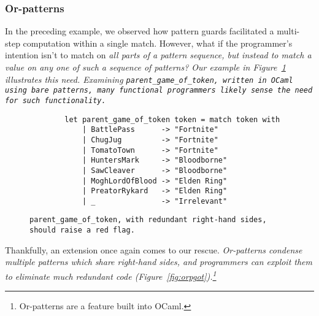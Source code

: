 \documentclass[manuscript,screen,review, 12pt]{acmart}
\begin{document}
        

\subsubsection{Or-patterns}

        In the preceding example, we observed how pattern guards facilitated a
        multi-step computation within a single match. However, what if the
        programmer's intention isn't to match on \it{all} parts of a pattern
        sequence, but instead to match a value on \it{any one} of such a
        sequence of patterns? Our example in Figure~\ref{fig:barepgot}
        illustrates this need. Examining \tt{parent\_game\_of\_token}, written
        in OCaml using bare patterns, many functional programmers likely sense
        the need for such functionality.
        
        
        \begin{figure}
            \begin{center}
                \begin{verbatim}
        let parent_game_of_token token = match token with 
            | BattlePass      -> "Fortnite"
            | ChugJug         -> "Fortnite"
            | TomatoTown      -> "Fortnite"
            | HuntersMark     -> "Bloodborne"
            | SawCleaver      -> "Bloodborne"
            | MoghLordOfBlood -> "Elden Ring"
            | PreatorRykard   -> "Elden Ring"
            | _               -> "Irrelevant"
                \end{verbatim}
            \end{center}    

        \caption{\tt{parent\_game\_of\_token}, with redundant right-hand sides,
        should raise a red flag.} 
        \label{fig:barepgot}
        \end{figure}

Thankfully, an extension once again comes to our rescue. \it{Or-patterns}
condense multiple patterns which share right-hand sides, and programmers can
exploit them to eliminate much redundant code
(Figure~\ref{fig:orpgot}).\footnote{Or-patterns are a feature built into OCaml.}
\end{document}

